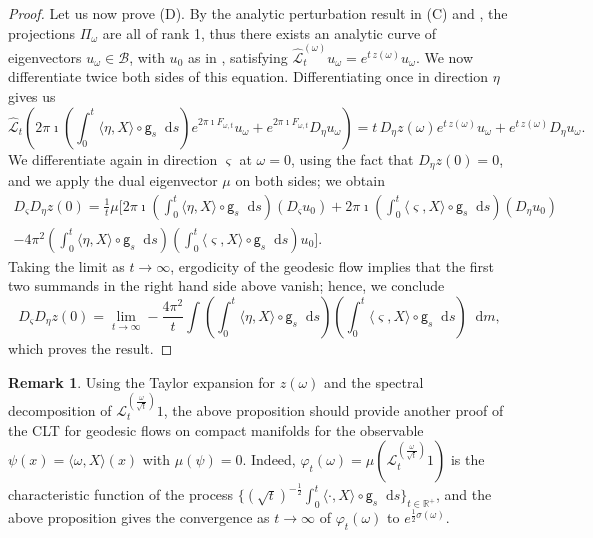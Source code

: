 \documentclass[11pt,letterpaper]{amsart}
\newcommand \cL {{\mathcal L}}
\newcommand \R {{ \mathbb R}}
\newcommand \cB {{\mathscr B}}
\newcommand{\geo}{\mathsf{g}}
\newcommand*{\diff}{\mathop{}\!\mathrm{d}}
\theoremstyle{definition}
\newtheorem{remark}[theorem]{Remark}
\begin{document}
\begin{proof}
Let us now prove (D).  
By the analytic perturbation result in (C) and , the projections $\Pi_{\omega}$ are all of rank 1, thus there exists an analytic curve of eigenvectors $u_\omega \in \cB$, with $u_0$ as in , satisfying $\hat\cL^{(\omega)}_t u_\omega = e^{t \, z(\omega)} u_\omega$.
We now differentiate twice both sides of this equation.
Differentiating once in direction $\eta$ gives us
\[
\hat\cL_t \left(2 \pi \imath \left(\int_0^t \langle \eta, X \rangle \circ \geo_s \diff s\right) e^{2 \pi \imath F_{\omega, t}} u_\omega + e^{2 \pi \imath F_{\omega, t}} D_\eta u_\omega \right) = t \, D_\eta z(\omega) e^{t \, z(\omega)} u_\omega + e^{t \, z(\omega)} D_\eta u_\omega.
\]
We differentiate again in direction $\varsigma$ at $\omega = 0$, using the fact that $D_\eta z(0)=0$, and we apply the dual eigenvector $\mu$ on both sides; we obtain
\begin{multline*}
D_\varsigma D_\eta z(0) = \frac{1}{t} \mu \Bigg[ 2 \pi \imath \left(\int_0^t \langle \eta, X \rangle \circ \geo_s \diff s\right) (D_\varsigma u_0) +  2 \pi \imath \left(\int_0^t \langle \varsigma, X \rangle \circ \geo_s \diff s\right) (D_\eta u_0) \\ - 4 \pi^2  \left(\int_0^t \langle \eta, X \rangle \circ \geo_s \diff s\right) \left(\int_0^t \langle \varsigma, X \rangle \circ \geo_s \diff s\right) u_0\Bigg].
\end{multline*}
Taking the limit as $t \to \infty$, ergodicity of the geodesic flow implies that the first two summands in the right hand side above vanish; hence, we conclude
\[
D_\varsigma D_\eta z(0) = \lim_{t \to \infty} - \frac{4\pi^2}{t} \int \left(\int_0^t \langle \eta, X \rangle \circ \geo_s \diff s\right) \left(\int_0^t \langle \varsigma, X \rangle \circ \geo_s \diff s\right) \diff m,
\]
which proves the result.
\end{proof}
  
  
  
  


\begin{remark}\label{rmk:CLT}
Using the Taylor expansion for $z(\omega)$ and the spectral decomposition of  $\cL^{(\frac{\omega}{\sqrt t})}_t1$, the above proposition should provide another proof of the CLT for geodesic flows on compact manifolds for the observable $\psi(x)=\langle \omega, X \rangle(x)$ with $\mu(\psi)=0$. Indeed,  $\varphi_t(\omega)=\mu(\cL^{(\frac{\omega}{\sqrt t})}_t1)$ is the characteristic function of the process $\{ (\sqrt t)^{-\frac 12}\int_0^t \langle \cdot, X \rangle\circ \geo_s\diff s\}_{t\in \R^+}$, and the above proposition gives the convergence as $t\to \infty$ of $\varphi_t(\omega)$ to  $e^{\frac 12 \sigma({\omega})}$.
\end{remark}
\end{document}
